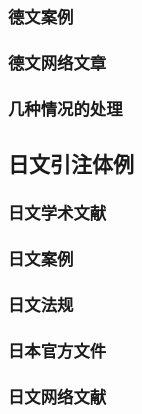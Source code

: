 \documentclass{article}
\begin{document}
\subsubsection{德文案例}

\begin{quotation}



\end{quotation}

\subsubsection{德文网络文章}

\begin{quotation}

\end{quotation}

\subsubsection{几种情况的处理}


\subsection{日文引注体例}

\subsubsection{日文学术文献}

\begin{quotation}




\end{quotation}

\subsubsection{日文案例}
\begin{quotation}

\end{quotation}

\subsubsection{日文法规}
\begin{quotation}
\end{quotation}
\subsubsection{日本官方文件}
\begin{quotation}

\end{quotation}
\subsubsection{日文网络文献}
\end{document}
